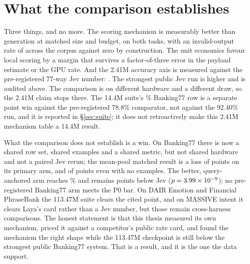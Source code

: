 \section{What the comparison establishes}

Three things, and no more. The scoring mechanism is measurably better than
generation at matched size and budget, on both tasks, with an invalid-output
rate of \CmpDecodeInvalid{} across the corpus against zero by construction. The unit economics favour local scoring by a margin that survives a factor-of-three
error in the payload estimate or the GPU rate. And the 2.41M accuracy axis is
measured against the pre-registered 77-way Jev number: \ShipHeadline. The
strongest public Jev run is higher and is audited above. The comparison
is on different hardware and a different draw, so the 2.41M claim stops there. The 14.4M suite's \SuiteSmallBank\% Banking77 row is a
separate point win against the pre-registered 78.8\% comparator, not against the
92.40\% run, and it is reported in \S\ref{sec:suite}; it does not retroactively
make this 2.41M mechanism table a 14.4M result.

What the comparison does not establish is a win. On Banking77 there is now a
shared row set, shared examples and a shared metric, but not shared hardware and
not a paired Jev rerun; the mean-pool matched result is a loss of
\JevMatchAbsGapAOne{} points on its primary arm, and of \JevMatchAbsGapNoEx{}
points even with no examples. The better, query-anchored arm reaches
\QueryPctQueryTwo\% and remains \QueryDiffAbs{} points below Jev
($p = 3.99\times10^{-9}$); no pre-registered Banking77 arm meets the P0 bar. On DAIR Emotion and Financial PhraseBank the 113.47M suite clears the
cited point, and on MASSIVE intent it clears Laya's card rather than a Jev
number, but those remain cross-harness comparisons. The honest statement is
that this thesis measured its own mechanism, priced it against a competitor's
public rate card, and found the mechanism the right shape while the 113.47M
checkpoint is still below the strongest public Banking77 system. That is a
result, and it is the one the data support.
